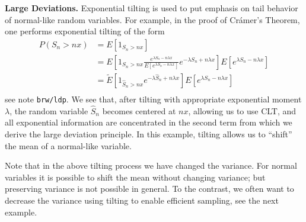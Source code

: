 \begin{example}
	\textbf{Large Deviations.} Exponential tilting is used to put emphasis on tail behavior of normal-like random variables. For example, in the proof of Cr\'amer's Theorem, one performs exponential tilting of the form
\begin{align*}
    P\left( S_n > n x \right)
    &= E\left[ 1_{S_n > n x} \right] \\
    &= E\left[ 1_{S_n > n x} \frac{e^{\lambda S_n - n \lambda x}}{ E \left[ e^{\lambda S_n - n \lambda x} \right]} e^{-\lambda S_n + n \lambda x} \right] E \left[ e^{\lambda S_n - n \lambda x} \right] \\
    &= \tilde E \left[ 1_{\hat S_n > n x} e^{-\lambda \hat S_n + n \lambda x} \right] E \left[ e^{\lambda S_n - n \lambda x} \right] \\
\end{align*}
see note \verb|brw/ldp|. We see that, after tilting with appropriate exponential moment $ \lambda$, the random variable $\hat{S} _n$ becomes centered at $nx$, allowing us to use CLT, and all exponential information are concentrated in the second term from which we derive the large deviation principle. In this example, tilting allows us to ``shift'' the mean of a normal-like variable.

\end{example}
Note that in the above tilting process we have changed the variance. For normal variables it is possible to shift the mean without changing variance; but preserving variance is not possible in general. To the contrast, we often want to decrease the variance using tilting to enable efficient sampling, see the next example.

